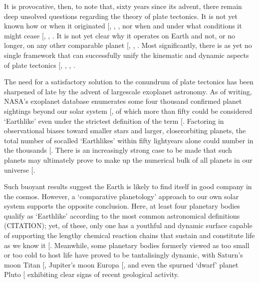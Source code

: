 \documentclass[letterpaper,10pt,english]{jupyterBook}
\begin{document}
\sphinxAtStartPar
It is provocative, then, to note that, sixty years since its advent, there remain deep unsolved questions regarding the theory of plate tectonics. It is not yet known how or when it originated {[}, , \sphinxcite{references:id722}{]}, nor when and under what conditions it might cease {[}, , \sphinxcite{references:id647}{]}. It is not yet clear why it operates on Earth and not, or no longer, on any other comparable planet {[}, , \sphinxcite{references:id349}{]}. Most significantly, there is as yet no single framework that can successfully unify the kinematic and dynamic aspects of plate tectonics {[}, , , \sphinxcite{references:id631}{]}.

\sphinxAtStartPar
The need for a satisfactory solution to the conundrum of plate tectonics has been sharpened of late by the advent of large\sphinxhyphen{}scale exoplanet astronomy. As of writing, NASA’s exoplanet database enumerates some four thousand confirmed planet sightings beyond our solar system {[}\sphinxcite{references:id462}{]}, of which more than fifty could be considered ‘Earth\sphinxhyphen{}like’ even under the strictest definition of the term {[}\sphinxcite{references:id296}{]}. Factoring in observational biases toward smaller stars and larger, closer\sphinxhyphen{}orbiting planets, the total number of so\sphinxhyphen{}called ‘Earth\sphinxhyphen{}likes’ within fifty light\sphinxhyphen{}years alone could number in the thousands {[}\sphinxcite{references:id464}{]}. There is an increasingly strong case to be made that such planets may ultimately prove to make up the numerical bulk of all planets in our universe {[}\sphinxcite{references:id463}{]}.

\sphinxAtStartPar
Such buoyant results suggest the Earth is likely to find itself in good company in the cosmos. However, a ‘comparative planetology’ approach to our own solar system supports the opposite conclusion. Here, at least four planetary bodies qualify as ‘Earth\sphinxhyphen{}like’ according to the most common astronomical definitions (CITATION); yet, of these, only one has a youthful and dynamic surface capable of supporting the lengthy chemical reaction chains that sustain and constitute life as we know it {[}\sphinxcite{references:id417}{]}. Meanwhile, some planetary bodies formerly viewed as too small or too cold to host life have proved to be tantalisingly dynamic, with Saturn’s moon Titan {[}\sphinxcite{references:id414}{]}, Jupiter’s moon Europa {[}\sphinxcite{references:id741}{]}, and even the spurned ‘dwarf’ planet Pluto {[}\sphinxcite{references:id299}{]} exhibiting clear signs of recent geological activity.
\end{document}
